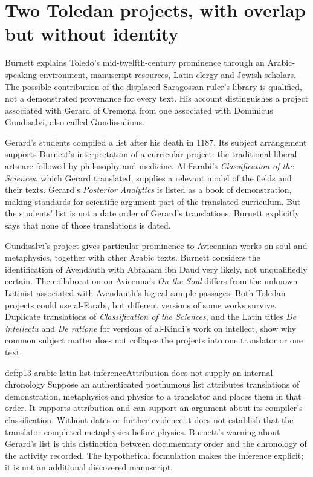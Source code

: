 \section{Two Toledan projects, with overlap but without identity}
\label{sec:p13-arabic-latin-toledo}

Burnett explains Toledo's mid-twelfth-century prominence through
an Arabic-speaking environment, manuscript resources, Latin clergy
and Jewish scholars. The possible contribution of the displaced
Saragossan ruler's library is qualified, not a demonstrated provenance
for every text. His account distinguishes a project associated
with Gerard of Cremona from one associated with Dominicus
Gundisalvi, also called Gundissalinus.
\cite[pp.~372--374]{Burnett2005ArabicLatinSupplement}

Gerard's students compiled a list after his death in 1187.
Its subject arrangement supports Burnett's interpretation of a
curricular project: the traditional liberal arts are followed by
philosophy and medicine. Al-Farabi's \emph{Classification of the
Sciences}, which Gerard translated, supplies a relevant model
of the fields and their texts. Gerard's \emph{Posterior Analytics}
is listed as a book of demonstration, making standards for
scientific argument part of the translated curriculum. But the
students' list is not a date order of Gerard's translations.
Burnett explicitly says that none of those translations is dated.
\cite[pp.~373--375, 387, notes~10--11, 391]{Burnett2005ArabicLatinSupplement}

Gundisalvi's project gives particular prominence to Avicennian
works on soul and metaphysics, together with other Arabic texts.
Burnett considers the identification of Avendauth with Abraham
ibn Daud very likely, not unqualifiedly certain. The collaboration
on Avicenna's \emph{On the Soul} differs from the unknown Latinist
associated with Avendauth's logical sample passages. Both Toledan
projects could use al-Farabi, but different versions of some works
survive. Duplicate translations of \emph{Classification of the
Sciences}, and the Latin titles \emph{De intellectu} and
\emph{De ratione} for versions of al-Kindi's work on intellect,
show why common subject matter does not collapse the projects
into one translator or one text.
\cite[pp.~376--381, 393--395]{Burnett2005ArabicLatinSupplement}

\begin{hbexample}{def:p13-arabic-latin-list-inference}{Attribution does not supply an internal chronology}
Suppose an authenticated posthumous list attributes translations
of demonstration, metaphysics and physics to a translator and
places them in that order. It supports attribution and can support
an argument about its compiler's classification. Without dates
or further evidence it does not establish that the translator
completed metaphysics before physics. Burnett's warning about
Gerard's list is this distinction between documentary order and
the chronology of the activity recorded. The hypothetical
formulation makes the inference explicit; it is not an additional
discovered manuscript.
\end{hbexample}

